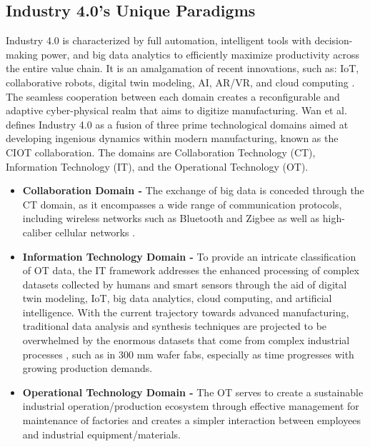 \subsection{Industry 4.0’s Unique Paradigms}\label{sec3_4:industry_4}
Industry 4.0 is characterized by full automation, intelligent tools with decision-making power, and big data analytics \cite{Butte2016-ii} to efficiently maximize productivity across the entire value chain. It is an amalgamation of recent innovations, such as: IoT, collaborative robots, digital twin modeling, AI, AR/VR, and cloud computing \cite{Zhou2015Industry4T, Cemernek2017-cz}. The seamless cooperation between each domain creates a reconfigurable and adaptive cyber-physical realm that aims to digitize manufacturing. Wan et al. \cite{Wan2022TheRT} defines Industry 4.0 as a fusion of three prime technological domains aimed at developing ingenious dynamics within modern manufacturing, known as the CIOT collaboration. The domains are Collaboration Technology (CT), Information Technology (IT), and the Operational Technology (OT)\cite{Wan2022TheRT}. 

\begin{itemize}
   \item \textbf{Collaboration Domain - }The exchange of big data is conceded through the CT domain, as it encompasses a wide range of communication protocols, including wireless networks such as Bluetooth and Zigbee as well as high-caliber cellular networks \cite{Wan2022TheRT}. 
     \item \textbf{Information Technology Domain - }To provide an intricate classification of OT data, the IT framework addresses the enhanced processing of complex datasets collected by humans and smart sensors through the aid of digital twin modeling, IoT, big data analytics, cloud computing, and artificial intelligence. With the current trajectory towards advanced manufacturing, traditional data analysis and synthesis techniques are projected to be overwhelmed by the enormous datasets that come from complex industrial processes \cite{Kumar2019-mt}, such as in 300 mm wafer fabs, especially as time progresses with growing production demands. 
   \item \textbf{Operational Technology Domain - }The OT serves to create a sustainable industrial operation/production ecosystem through effective management for maintenance of factories and creates a simpler interaction between employees and industrial equipment/materials. 
  
    
\end{itemize}
